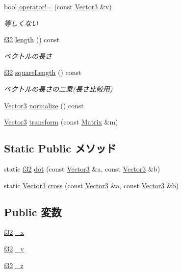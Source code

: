 \begin{DoxyCompactItemize}
bool \hyperlink{struct_vector3_a3bb95b94a0911ae9f1eae66695f65c70}{operator!=} (const \hyperlink{struct_vector3}{Vector3} \&v)
\begin{DoxyCompactList}\small\item\em 等しくない \end{DoxyCompactList}\item 
\hyperlink{_main_8h_a5f6906312a689f27d70e9d086649d3fd}{f32} \hyperlink{struct_vector3_ab75b4d7d7fad114d84f2e081edef68b6}{length} () const 
\begin{DoxyCompactList}\small\item\em ベクトルの長さ \end{DoxyCompactList}\item 
\hyperlink{_main_8h_a5f6906312a689f27d70e9d086649d3fd}{f32} \hyperlink{struct_vector3_ad67a64036469827d79ce4d821d49f329}{square\-Length} () const 
\begin{DoxyCompactList}\small\item\em ベクトルの長さの二乗(長さ比較用) \end{DoxyCompactList}\item 
\hyperlink{struct_vector3}{Vector3} \hyperlink{struct_vector3_aa9a41fdd0584091e48784c96999972f1}{normalize} () const 
\item 
\hyperlink{struct_vector3}{Vector3} \hyperlink{struct_vector3_a0ffd8b1ab26781d0524802cce8d5e0c3}{transform} (const \hyperlink{struct_matrix}{Matrix} \&m)
\end{DoxyCompactItemize}
\subsection*{Static Public メソッド}
\begin{DoxyCompactItemize}
\item 
static \hyperlink{_main_8h_a5f6906312a689f27d70e9d086649d3fd}{f32} \hyperlink{struct_vector3_a320f377d62a53de63377c78d1e724a11}{dot} (const \hyperlink{struct_vector3}{Vector3} \&a, const \hyperlink{struct_vector3}{Vector3} \&b)
\item 
static \hyperlink{struct_vector3}{Vector3} \hyperlink{struct_vector3_a36a1cc3bd7107c9f05cafaa1a9b0d16c}{cross} (const \hyperlink{struct_vector3}{Vector3} \&a, const \hyperlink{struct_vector3}{Vector3} \&b)
\end{DoxyCompactItemize}
\subsection*{Public 変数}
\begin{DoxyCompactItemize}
\item 
\hyperlink{_main_8h_a5f6906312a689f27d70e9d086649d3fd}{f32} \hyperlink{struct_vector3_a345b01a1352e569e37d0226af4eff5c6}{\-\_\-x}
\item 
\hyperlink{_main_8h_a5f6906312a689f27d70e9d086649d3fd}{f32} \hyperlink{struct_vector3_a5e3cec066537515a2387a34b57aed6ed}{\-\_\-y}
\item 
\hyperlink{_main_8h_a5f6906312a689f27d70e9d086649d3fd}{f32} \hyperlink{struct_vector3_a895ad23c1a78588ace5c4aaadae984c5}{\-\_\-z}
\end{DoxyCompactItemize}


